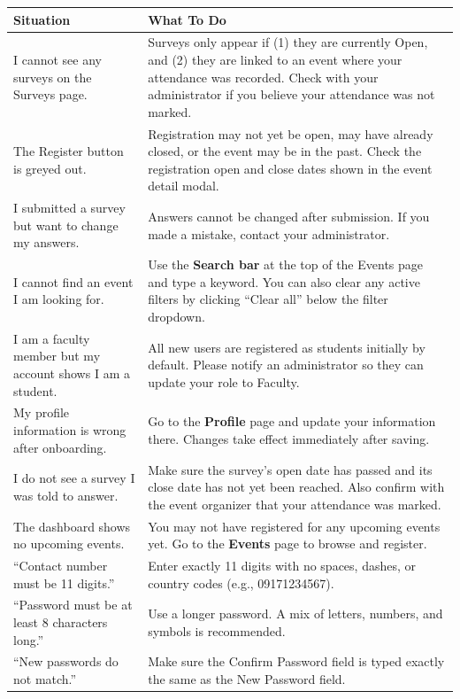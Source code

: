 \documentclass[12pt, a4paper]{article}
\begin{document}
\begin{longtable}{|>{\raggedright\arraybackslash}p{5.5cm}|>{\raggedright\arraybackslash}p{7.5cm}|}
\hline
\rowcolor{lightgray}
\textbf{Situation} & \textbf{What To Do} \\
\hline
I cannot see any surveys on the Surveys page. &
Surveys only appear if (1) they are currently Open, and (2) they are linked to an event where your attendance was recorded. Check with your administrator if you believe your attendance was not marked. \\
\hline
The Register button is greyed out. &
Registration may not yet be open, may have already closed, or the event may be in the past. Check the registration open and close dates shown in the event detail modal. \\
\hline
I submitted a survey but want to change my answers. &
Answers cannot be changed after submission. If you made a mistake, contact your administrator. \\
\hline
I cannot find an event I am looking for. &
Use the \textbf{Search bar} at the top of the Events page and type a keyword. You can also clear any active filters by clicking ``Clear all'' below the filter dropdown. \\
\hline
I am a faculty member but my account shows I am a student. &
All new users are registered as students initially by default. Please notify an administrator so they can update your role to Faculty. \\
\hline
My profile information is wrong after onboarding. &
Go to the \textbf{Profile} page and update your information there. Changes take effect immediately after saving. \\
\hline
I do not see a survey I was told to answer. &
Make sure the survey's open date has passed and its close date has not yet been reached. Also confirm with the event organizer that your attendance was marked. \\
\hline
The dashboard shows no upcoming events. &
You may not have registered for any upcoming events yet. Go to the \textbf{Events} page to browse and register. \\
\hline
``Contact number must be 11 digits.'' &
Enter exactly 11 digits with no spaces, dashes, or country codes (e.g., 09171234567). \\
\hline
``Password must be at least 8 characters long.'' &
Use a longer password. A mix of letters, numbers, and symbols is recommended. \\
\hline
``New passwords do not match.'' &
Make sure the Confirm Password field is typed exactly the same as the New Password field. \\
\hline
\end{longtable}
\end{document}
